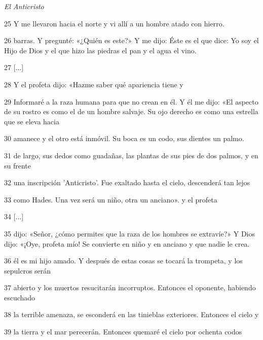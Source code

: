 \par \textit{El Anticristo}

\par 25 Y me llevaron hacia el norte y vi allí a un hombre atado con hierro.

\par 26 barras. Y pregunté: «¿Quién es este?» Y me dijo: Éste es el que dice: Yo soy el Hijo de Dios y el que hizo las piedras el pan y el agua el vino.

\par 27 [...]

\par 28 Y el profeta dijo: «Hazme saber qué apariencia tiene y

\par 29 Informaré a la raza humana para que no crean en él. Y él me dijo: «El aspecto de su rostro es como el de un hombre salvaje. Su ojo derecho es como una estrella que se eleva hacia

\par 30 amanece y el otro está inmóvil. Su boca es un codo, sus dientes un palmo.

\par 31 de largo, sus dedos como guadañas, las plantas de sus pies de dos palmos, y en su frente

\par 32 una inscripción 'Anticristo'. Fue exaltado hasta el cielo, descenderá tan lejos

\par 33 como Hades. Una vez será un niño, otra un anciano». y el profeta

\par 34 [...]

\par 35 dijo: «Señor, ¿cómo permites que la raza de los hombres se extravíe?» Y Dios dijo: «¡Oye, profeta mío! Se convierte en niño y en anciano y que nadie le crea.

\par 36 él es mi hijo amado. Y después de estas cosas se tocará la trompeta, y los sepulcros serán

\par 37 abierto y los muertos resucitarán incorruptos. Entonces el oponente, habiendo escuchado

\par 38 la terrible amenaza, se esconderá en las tinieblas exteriores. Entonces el cielo y

\par 39 la tierra y el mar perecerán. Entonces quemaré el cielo por ochenta codos

